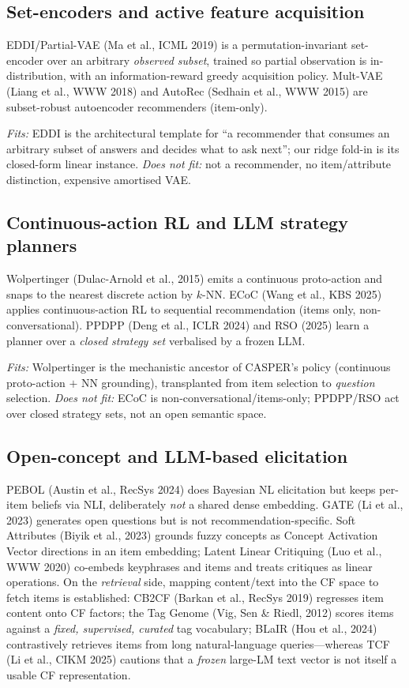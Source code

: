 \documentclass[11pt]{article}
\begin{document}
\subsection{Set-encoders and active feature acquisition}
EDDI/Partial-VAE (Ma et al., ICML 2019) is a permutation-invariant set-encoder over an arbitrary \emph{observed
subset}, trained so partial observation is in-distribution, with an information-reward greedy acquisition policy.
Mult-VAE (Liang et al., WWW 2018) and AutoRec (Sedhain et al., WWW 2015) are subset-robust autoencoder
recommenders (item-only).

\emph{Fits:} EDDI is the architectural template for ``a recommender that consumes an arbitrary subset of answers
and decides what to ask next''; our ridge fold-in is its closed-form linear instance. \emph{Does not fit:} not a
recommender, no item/attribute distinction, expensive amortised VAE.

\subsection{Continuous-action RL and LLM strategy planners}
Wolpertinger (Dulac-Arnold et al., 2015) emits a continuous proto-action and snaps to the nearest discrete action
by $k$-NN. ECoC (Wang et al., KBS 2025) applies continuous-action RL to sequential recommendation (items only,
non-conversational). PPDPP (Deng et al., ICLR 2024) and RSO (2025) learn a planner over a \emph{closed strategy
set} verbalised by a frozen LLM.

\emph{Fits:} Wolpertinger is the mechanistic ancestor of CASPER's policy (continuous proto-action $+$ NN
grounding), transplanted from item selection to \emph{question} selection. \emph{Does not fit:} ECoC is
non-conversational/items-only; PPDPP/RSO act over closed strategy sets, not an open semantic space.

\subsection{Open-concept and LLM-based elicitation}
PEBOL (Austin et al., RecSys 2024) does Bayesian NL elicitation but keeps per-item beliefs via NLI, deliberately
\emph{not} a shared dense embedding. GATE (Li et al., 2023) generates open questions but is not
recommendation-specific. Soft Attributes (Biyik et al., 2023) grounds fuzzy concepts as Concept Activation Vector
directions in an item embedding; Latent Linear Critiquing (Luo et al., WWW 2020) co-embeds keyphrases and items
and treats critiques as linear operations. On the \emph{retrieval} side, mapping content/text into the CF space to
fetch items is established: CB2CF (Barkan et al., RecSys 2019) regresses item content onto CF factors; the Tag
Genome (Vig, Sen \& Riedl, 2012) scores items against a \emph{fixed, supervised, curated} tag vocabulary; BLaIR
(Hou et al., 2024) contrastively retrieves items from long natural-language queries---whereas TCF (Li et al., CIKM
2025) cautions that a \emph{frozen} large-LM text vector is not itself a usable CF representation.
\end{document}
